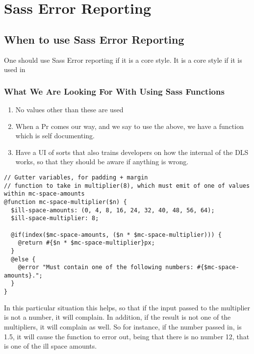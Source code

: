 \maketitle{}
\section{ Sass Error Reporting }

\subsection{ When to use Sass Error Reporting }
One should use Sass Error reporting if it is a core style. It is a core style if
it is used in

\subsubsection{ What We Are Looking For With Using Sass Functions }
\begin{enumerate}
  \item No values other than these are used
  \item When a Pr comes our way, and we say to use the above, we have a function which is self documenting.
  \item Have a UI of sorts that also trains developers on how the internal of
  the DLS works, so that they should be aware if anything is wrong.
\end{enumerate}

\begin{lstlisting}
// Gutter variables, for padding + margin
// function to take in multiplier(8), which must emit of one of values within mc-space-amounts
@function mc-space-multiplier($n) {
  $ill-space-amounts: (0, 4, 8, 16, 24, 32, 40, 48, 56, 64);
  $ill-space-multiplier: 8;

  @if(index($mc-space-amounts, ($n * $mc-space-multiplier))) {
    @return #{$n * $mc-space-multiplier}px;
  }
  @else {
    @error "Must contain one of the following numbers: #{$mc-space-amounts}.";
  }
}
\end{lstlisting}

In this particular situation this helps, so that if the input passed to the
multiplier is not a number, it will complain. In addition, if the result is not
one of the multipliers, it will complain as well. So for instance, if the number
passed in, is 1.5, it will cause the function to error out, being that there is
no number 12, that is one of the ill space amounts.
